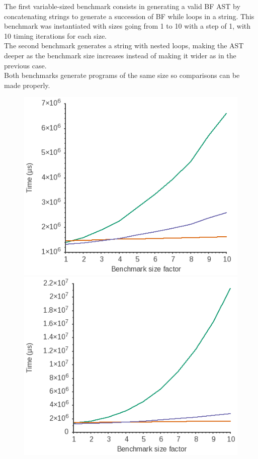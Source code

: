 \documentclass[../../../main]{subfiles}
\begin{document}
The first variable-sized benchmark consists in generating a valid BF AST by
concatenating strings to generate a succession of BF while loops in a
\constexpr string. This benchmark was instantiated with sizes going from 1 to
10 with a step of 1, with 10 timing iterations for each size.\\

The second benchmark generates a string with
nested loops, making the AST deeper as the benchmark size increases instead
of making it wider as in the previous case.\\

Both benchmarks generate programs of the same size so comparisons can be made
properly.

\begin{figure}
\includegraphics[scale=0.5]{images/bf-consecutive_loops.png}
\includegraphics[scale=0.5]{images/bf-imbricated_loops.png}

\end{figure}
\end{document}
